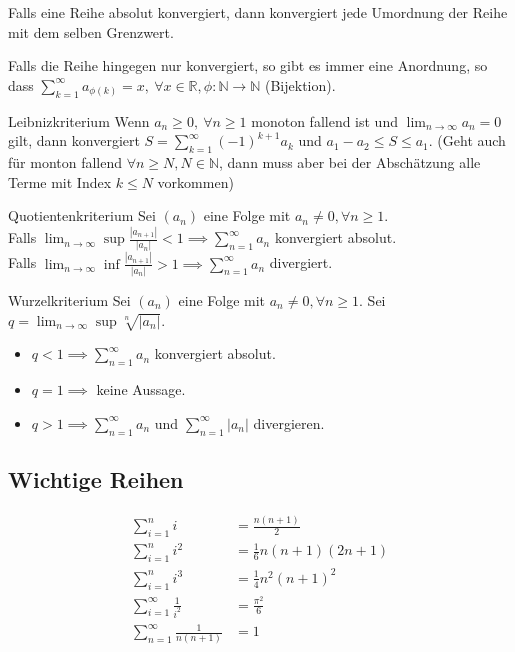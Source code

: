 \documentclass[a4paper,fontsize = 7pt]{scrartcl}
\def\limn{\lim_{n\to \infty}}
\def\sumk{\sum_{k=1}^\infty}
\def\R{\mathbb{R}}
\def\N{\mathbb{N}}
\begin{document}
Falls eine Reihe absolut konvergiert, dann konvergiert jede Umordnung der Reihe mit dem selben Grenzwert.

Falls die Reihe hingegen nur konvergiert, so gibt es immer eine Anordnung, so dass $\sum_{k=1}^\infty a_{\phi(k)} = x, \ \forall x\in \R, \phi: \N \to \N$ (Bijektion).

\begin{subbox}{Leibnizkriterium}
  \vspace{-4pt}
Wenn $a_n \ge 0, \ \forall n \ge 1$ monoton fallend ist und $\limn a_n = 0$ gilt, dann konvergiert $S = \sumk (-1)^{k+1} a_k$ und $a_1 - a_2 \le S \le a_1$.
(Geht auch für monton fallend $\forall n \geq N, N \in \N$, dann muss aber bei der Abschätzung alle Terme mit Index $k \leq N$ vorkommen)
  \vspace{-4pt}
\end{subbox}

\begin{mainbox}{Quotientenkriterium}
  \vspace{-4pt}
Sei $(a_n)$ eine Folge mit $a_n \ne 0, \forall n \ge 1$. \\ Falls $\limn \sup \frac{|a_{n+1}|}{|a_n|} < 1 \implies \sum_{n=1}^\infty a_n$ konvergiert absolut. \\Falls $\limn \inf \frac{|a_{n+1}|}{|a_n|} > 1 \implies \sum_{n=1}^\infty a_n$ divergiert.  
  \vspace{-4pt}
\end{mainbox}

\begin{mainbox}{Wurzelkriterium}
  \vspace{-4pt}
  Sei $(a_n)$ eine Folge mit $a_n \ne 0, \forall n \ge 1$. Sei $q = \limn \sup \sqrt[n]{|a_n|}$. 
\begin{itemize}
 \item $q < 1 \implies \sum_{n=1}^\infty a_n$ konvergiert absolut.
 \item $q = 1 \implies$ keine Aussage.
 \item $q > 1 \implies \sum_{n=1}^\infty a_n$ und $\sum_{n=1}^\infty |a_n|$ divergieren.
\end{itemize}
\vspace{-12pt}
\end{mainbox}

\subsection{Wichtige Reihen}
\begin{align*}
 \sum_{i=1}^n i &= \frac{n(n+1)}{2} \\
 \sum_{i=1}^n i^2 &= \frac{1}{6}n(n+1)(2n+1) \\
 \sum_{i=1}^n i^3 &= \frac{1}{4}n^2(n+1)^2 \\
 \sum_{i=1}^\infty \frac{1}{i^2} &= \frac{\pi^2}{6} \\
 \sum_{n=1}^\infty \frac{1}{n(n+1)} &= 1
\end{align*}
\end{document}
